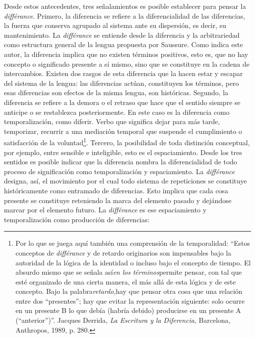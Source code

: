 \documentclass{book}
\begin{document}
Desde estos antecedentes, tres señalamientos es posible establecer para
pensar la \emph{différance}. Primero, la diferencia se refiere a la
diferencialidad de las diferencias, la fuerza que conserva agrupado al
sistema ante su dispersión, es decir, su mantenimiento. La
\emph{différance} se entiende desde la diferencia y la arbitrariedad
como estructura general de la lengua propuesta por Saussure. Como indica
este autor, la diferencia implica que no existen términos positivos,
esto es, que no hay concepto o significado presente a sí mismo, sino que
se constituye en la cadena de intercambios. Existen dos rasgos de esta
diferencia que la hacen estar y escapar del sistema de la lengua: las
diferencias actúan, constituyen los términos, pero esas diferencias son
efectos de la misma lengua, son históricas. Segundo, la diferencia se
refiere a la demora o el retraso que hace que el sentido siempre se
anticipe o se restablezca posteriormente. En este caso es la diferencia
como temporalización, como diferir. Verbo que significa dejar para más
tarde, temporizar, recurrir a una mediación temporal que suspende el
cumplimiento o satisfacción de la voluntad\footnote{Por lo que se juega
  aquí también una comprensión de la temporalidad: \enquote{Estos conceptos de
  \emph{différance} y de retardo originarios son impensables bajo la
  autoridad de la lógica de la identidad o incluso bajo el concepto de
  tiempo. El absurdo mismo que se señala así\emph{en los
  términos}permite pensar, con tal que esté organizado de una cierta
  manera, el más allá de esta lógica y de este concepto. Bajo la
  palabra\emph{retardo,}hay que pensar otra cosa que una relación entre
  dos ``presentes''; hay que evitar la representación siguiente: solo
  ocurre en un presente B lo que debía (habría debido) producirse en un
  presente A (``anterior'')}. Jacques Derrida, \emph{La Escritura y la
  Diferencia,} Barcelona, Anthropos, 1989, p. 280.}. Tercero, la
posibilidad de toda distinción conceptual, por ejemplo, entre sensible e
inteligible, esto es el espaciamiento. Desde los tres sentidos es
posible indicar que la diferencia nombra la diferencialidad de todo
proceso de significación como temporalización y espaciamiento. La
\emph{différance} designa, así, el movimiento por el cual todo sistema
de repeticiones se constituye históricamente como entramado de
diferencias. Esto implica que cada cosa presente se constituye
reteniendo la marca del elemento pasado y dejándose marcar por el
elemento futuro. La \emph{différance} es ese espaciamiento y
temporalización como producción de diferencias:
\end{document}
